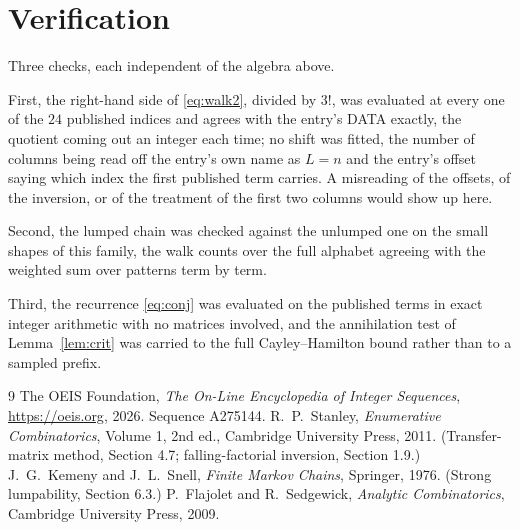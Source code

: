 \documentclass[11pt,a4paper]{article}
\theoremstyle{plain}
\theoremstyle{definition}
\begin{document}
\section{Verification}

Three checks, each independent of the algebra above.

First, the right-hand side of \eqref{eq:walk2}, divided by $3!$, was evaluated at every
one of the $24$ published indices and agrees with the entry's DATA exactly, the quotient
coming out an integer each time; no shift was fitted, the number of columns being read off the
entry's own name as $L=n$ and the entry's offset saying which index the first published
term carries. A misreading of the offsets, of the inversion, or of the treatment of the first
two columns would show up here.

Second, the lumped chain was checked against the unlumped one on the small shapes of this
family, the walk counts over the full alphabet agreeing with the weighted sum over patterns
term by term.

Third, the recurrence \eqref{eq:conj} was evaluated on the published terms in exact integer
arithmetic with no matrices involved, and the annihilation test of Lemma~\ref{lem:crit} was
carried to the full Cayley--Hamilton bound rather than to a sampled prefix.

\begin{thebibliography}{9}
 The OEIS Foundation, \emph{The On-Line Encyclopedia of Integer
Sequences}, \url{https://oeis.org}, 2026. Sequence A275144.
 R.~P.~Stanley, \emph{Enumerative Combinatorics}, Volume 1, 2nd ed.,
Cambridge University Press, 2011. (Transfer-matrix method, Section 4.7; falling-factorial
inversion, Section 1.9.)
 J.~G.~Kemeny and J.~L.~Snell, \emph{Finite Markov Chains}, Springer,
1976. (Strong lumpability, Section 6.3.)
 P.~Flajolet and R.~Sedgewick, \emph{Analytic Combinatorics}, Cambridge
University Press, 2009.
\end{thebibliography}
\end{document}
